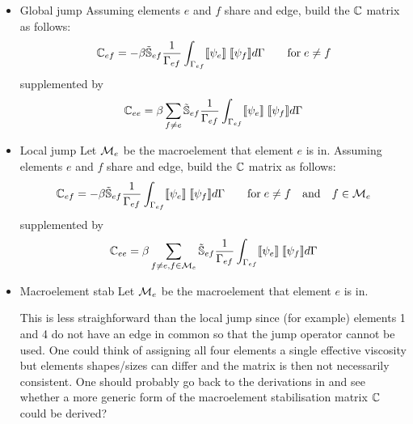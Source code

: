 \begin{itemize}
\item{Global jump} Assuming elements $e$ and $f$ share and edge, build the ${\mathbb{C}}$ matrix as follows:
\begin{equation}
{\mathbb{C}}_{ef} = -\beta \tilde{{\mathbb{S}}}_{ef}  
\frac{1}{\Gamma_{ef}} \int_{\Gamma_{ef}} \llbracket \psi_e \rrbracket \; \llbracket \psi_f \rrbracket d\Gamma
\qquad
\text{for} \; e\ne f
\end{equation}
supplemented by
\[
{\mathbb{C}}_{ee} =  \beta 
\sum_{f\ne e} \tilde{{\mathbb{S}}}_{ef}\frac{1}{\Gamma_{ef}} \int_{\Gamma_{ef}} \llbracket \psi_e \rrbracket \; \llbracket \psi_f \rrbracket d\Gamma
\]

\item{Local jump}  Let ${\cal M}_e$ be the macroelement that element $e$ is in. Assuming elements $e$ and $f$ share and edge, build the ${\mathbb{C}}$ matrix as follows:
\begin{equation}
{\mathbb{C}}_{ef} = -\beta \tilde{{\mathbb{S}}}_{ef}  
\frac{1}{\Gamma_{ef}} \int_{\Gamma_{ef}} \llbracket \psi_e \rrbracket \; \llbracket \psi_f \rrbracket d\Gamma
\qquad
\text{for} \; e\ne f \quad \text{and} \quad f\in {\cal M}_e
\end{equation}
supplemented by
\[
{\mathbb{C}}_{ee} =  \beta 
\sum_{f\ne e, f\in {\cal M}_e} \tilde{{\mathbb{S}}}_{ef}\frac{1}{\Gamma_{ef}} \int_{\Gamma_{ef}} \llbracket \psi_e \rrbracket \; \llbracket \psi_f \rrbracket d\Gamma
\]



\item{Macroelement stab} 
Let ${\cal M}_e$ be the macroelement that element $e$ is in. 
\begin{center}

\end{center}

This is less straighforward than the local jump since 
(for example) elements 1 and 4 do not have an edge in common so that the jump operator cannot be used. 
One could think of assigning all four elements a single effective viscosity but elements shapes/sizes can differ and the matrix is then not necessarily consistent. 
One should probably go back to the derivations in 
\textcite{elsw} and see whether a more generic form of the macroelement stabilisation matrix ${\mathbb{C}}$ could be derived?

\end{itemize}

